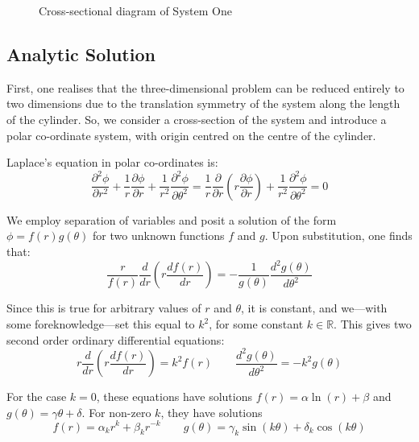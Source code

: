 \documentclass[12pt, a4paper]{article}
\newcommand{\be}{\begin{equation}}
\newcommand{\ee}{\end{equation}}
\begin{document}
\begin{figure}[h!]
\begin{center}
\end{center}
\caption{Cross-sectional diagram of System One}
\label{fig:sys one}
\end{figure}

\subsection{Analytic Solution}

First, one realises that the three-dimensional problem can be reduced entirely to two
dimensions due to the translation symmetry of the system along the length of the
cylinder. So, we consider a cross-section of the system and introduce a polar
co-ordinate system, with origin centred on the centre of the cylinder.

Laplace's equation in polar co-ordinates is: 
%
\be
\frac{\partial^2 \phi}{\partial r^2}+\frac{1}{r}\frac{\partial \phi}{\partial r}+\frac{1}{r^2}\frac{\partial^2 \phi}{\partial \theta^2}
= \frac{1}{r}\frac{\partial}{\partial r}(r \frac{\partial \phi}{\partial r}) + \frac{1}{r^2}\frac{\partial ^2 \phi}{\partial \theta^2}
= 0
\ee

We employ separation of variables and posit a solution of the form
$\phi = f(r)g(\theta)$ for two unknown functions $f$ and $g$. Upon substitution,
one finds that:
%
\be
\frac{r}{f(r)}\frac{d}{dr}(r \frac{df(r)}{dr}) =- \frac{1}{g(\theta)}\frac{d^2 g(\theta)}{d\theta^2}
\ee

Since this is true for arbitrary values of $r$ and $\theta$, it is constant, and
we---with some foreknowledge---set this equal to $k^2$, for some constant 
$k\in\mathbb{R}$.
This gives two second order ordinary differential equations:
%
\be
r\frac{d}{dr}(r \frac{df(r)}{dr}) = k^2 f(r) \qquad
\frac{d^2 g(\theta)}{d\theta^2}=-k^2 g(\theta)
\ee

For the case $k=0$, these equations have solutions
$f(r)=\alpha \ln(r) + \beta$ and $g(\theta) = \gamma \theta + \delta$.
For non-zero $k$, they have solutions
%
\be
f(r)=\alpha_k r^k + \beta_k r^{-k}
\qquad
g(\theta)= \gamma_k \sin(k\theta)+\delta_k \cos(k\theta)
\ee
\end{document}
